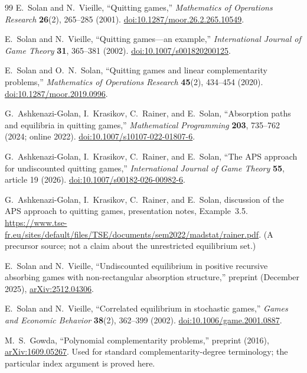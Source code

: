 \documentclass[11pt,a4paper]{article}
\theoremstyle{definition}
\theoremstyle{remark}
\begin{document}
\begingroup
\footnotesize
\setlength{\parskip}{1pt}
\begin{thebibliography}{99}
\setlength{\itemsep}{1pt}
E.~Solan and N.~Vieille, ``Quitting games,'' \emph{Mathematics of Operations Research} \textbf{26}(2), 265--285 (2001). \href{https://doi.org/10.1287/moor.26.2.265.10549}{doi:10.1287/moor.26.2.265.10549}.

E.~Solan and N.~Vieille, ``Quitting games---an example,'' \emph{International Journal of Game Theory} \textbf{31}, 365--381 (2002). \href{https://doi.org/10.1007/s001820200125}{doi:10.1007/s001820200125}.

E.~Solan and O.~N.~Solan, ``Quitting games and linear complementarity problems,'' \emph{Mathematics of Operations Research} \textbf{45}(2), 434--454 (2020). \href{https://doi.org/10.1287/moor.2019.0996}{doi:10.1287/moor.2019.0996}.

G.~Ashkenazi-Golan, I.~Krasikov, C.~Rainer, and E.~Solan, ``Absorption paths and equilibria in quitting games,'' \emph{Mathematical Programming} \textbf{203}, 735--762 (2024; online 2022). \href{https://doi.org/10.1007/s10107-022-01807-6}{doi:10.1007/s10107-022-01807-6}.

G.~Ashkenazi-Golan, I.~Krasikov, C.~Rainer, and E.~Solan, ``The APS approach for undiscounted quitting games,'' \emph{International Journal of Game Theory} \textbf{55}, article 19 (2026). \href{https://doi.org/10.1007/s00182-026-00982-6}{doi:10.1007/s00182-026-00982-6}.

G.~Ashkenazi-Golan, I.~Krasikov, C.~Rainer, and E.~Solan, discussion of the APS approach to quitting games, presentation notes, Example~3.5. \url{https://www.tse-fr.eu/sites/default/files/TSE/documents/sem2022/madstat/rainer.pdf}. (A precursor source; not a claim about the unrestricted equilibrium set.)

E.~Solan and N.~Vieille, ``Undiscounted equilibrium in positive recursive absorbing games with non-rectangular absorption structure,'' preprint (December 2025), \href{https://arxiv.org/abs/2512.04306}{arXiv:2512.04306}.

E.~Solan and N.~Vieille, ``Correlated equilibrium in stochastic games,'' \emph{Games and Economic Behavior} \textbf{38}(2), 362--399 (2002). \href{https://doi.org/10.1006/game.2001.0887}{doi:10.1006/game.2001.0887}.

M.~S.~Gowda, ``Polynomial complementarity problems,'' preprint (2016), \href{https://arxiv.org/abs/1609.05267}{arXiv:1609.05267}. Used for standard complementarity-degree terminology; the particular index argument is proved here.


\end{thebibliography}
\end{document}
